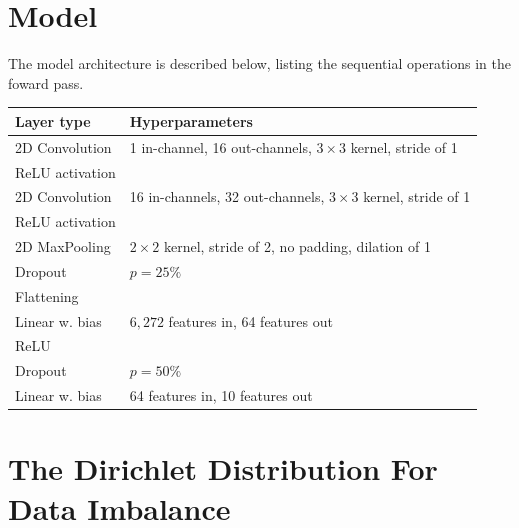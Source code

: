 \documentclass{article}
\begin{document}
\appendix
\section{Model}
\label{app:model}
The model architecture is described below, listing the sequential operations in the foward pass.
\begin{table}[htb!]
    \centering
    \begin{tabular}{l|p{5cm}}
            Layer type & Hyperparameters\\
            \hline
            2D Convolution & 1 in-channel, 16 out-channels, $3\times 3$ kernel, stride of 1\\
            ReLU activation\\
            2D Convolution & 16 in-channels, 32 out-channels, $3\times 3$ kernel, stride of 1\\
            ReLU activation\\
            2D MaxPooling & $2\times 2$ kernel, stride of 2, no padding, dilation of 1\\
            Dropout & $p=25\%$\\
            Flattening\\
            Linear w. bias & $6,272$ features in, 64 features out\\
            ReLU \\
            Dropout & $p=50\%$\\
            Linear w. bias & 64 features in, 10 features out
        \end{tabular}
\end{table}\noindent
\section{The Dirichlet Distribution For Data Imbalance}
\end{document}

